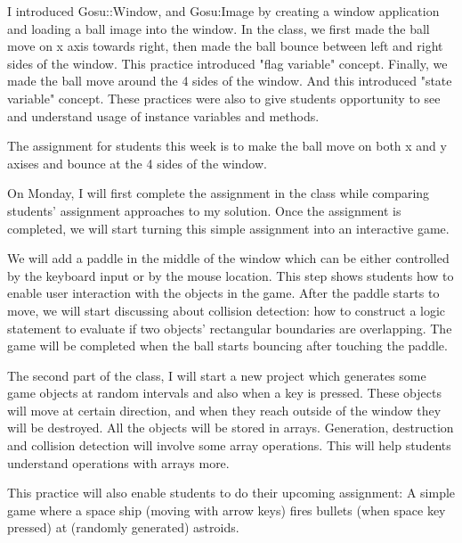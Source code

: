 \documentclass[11pt,dvipsnames]{article}
\begin{document}
I introduced Gosu::Window, and Gosu:Image by creating a window application and loading a ball image into the window. In the class, we first made the ball move on x axis towards right, then made the ball bounce between left and right sides of the window. This practice introduced "flag variable" concept. Finally, we made the ball move around the 4 sides of the window. And this introduced "state variable" concept. These practices were also to give students opportunity to see and understand usage of instance variables and methods.

The assignment for students this week is to make the ball move on both x and y axises and bounce at the 4 sides of the window.

On Monday, I will first complete the assignment in the class while comparing students' assignment approaches to my solution. Once the assignment is completed, we will start turning this simple assignment into an interactive game. 

We will add a paddle in the middle of the window which can be either controlled by the keyboard input or by the mouse location. This step shows students how to enable user interaction with the objects in the game. After the paddle starts to move, we will start discussing about collision detection: how to construct a logic statement to evaluate if two objects' rectangular boundaries are overlapping. The game will be completed when the ball starts bouncing after touching the paddle.

The second part of the class, I will start a new project which generates some game objects at random intervals and also when a key is pressed. These objects will move at certain direction, and when they reach outside of the window they will be destroyed. All the objects will be stored in arrays. Generation, destruction and collision detection will involve some array operations. This will help students understand operations with arrays more.

This practice will also enable students to do their upcoming assignment:  A simple game where a space ship (moving with arrow keys) fires bullets (when space key pressed) at (randomly generated) astroids.

	
\end{document}
